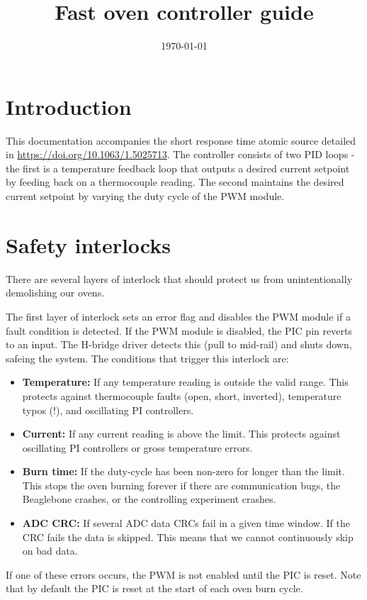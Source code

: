 \documentclass{article}
\begin{document}
\title{Fast oven controller guide}
\date{\today}

\maketitle


\section{Introduction}
This documentation accompanies the short response time atomic source detailed in \url{https://doi.org/10.1063/1.5025713}.
The controller consists of two PID loops - the first is a temperature feedback loop that outputs a desired current setpoint by feeding back on a thermocouple reading.
The second maintains the desired current setpoint by varying the duty cycle of the PWM module.

\section{Safety interlocks}
There are several layers of interlock that should protect us from unintentionally
demolishing our ovens.

The first layer of interlock sets an error flag and disables the PWM module if a
fault condition is detected. If the PWM module is disabled, the PIC pin reverts
to an input. The H-bridge driver detects this (pull to mid-rail) and shuts down,
safeing the system. The conditions that trigger this interlock are:
\begin{itemize}
\item \textbf{Temperature:}
If any temperature reading is outside the valid range. This protects
against thermocouple faults (open, short, inverted), temperature typos (!), and
oscillating PI controllers.
\item \textbf{Current:}
If any current reading is above the limit. This protects against
oscillating PI controllers or gross temperature errors.
\item \textbf{Burn time:}
If the duty-cycle has been non-zero for longer than the limit. This stops the
oven burning forever if there are communication bugs, the Beaglebone crashes, or
the controlling experiment crashes.
\item \textbf{ADC CRC:}
If several ADC data CRCs fail in a given time window. If the CRC fails the data
is skipped. This means that we cannot continuously skip on bad data.
\end{itemize}
If one of these errors occurs, the PWM is not enabled until the PIC is reset.
Note that by default the PIC is reset at the start of each oven burn cycle.
\end{document}
